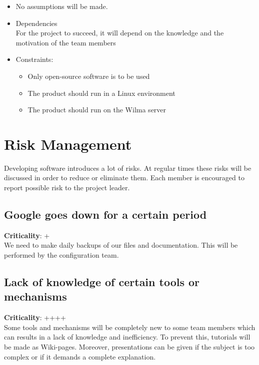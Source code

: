 \documentclass[a4paper, 12pt]{report}
\begin{document}
			\begin{itemize}
				
				\item No assumptions will be made.
				
				\item Dependencies \\
 					  For the project to succeed, it will depend on
					  the knowledge and the motivation of the team members	
				
				\item Constraints:
				\begin{itemize}
					\item Only open-source software is to be used
					\item The product should run in a Linux environment
					\item The product should run on the Wilma server
				\end{itemize}
				
			\end{itemize}	
			
		\section{Risk Management}
			
			Developing software introduces a lot of risks. At regular times these risks will
			be discussed in order to reduce or eliminate them. Each member is encouraged to report
			possible risk to the project leader.
			
			\subsection{Google goes down for a certain period}
			\textbf{Criticality}: + \\
			We need to make daily backups of our files and documentation. This will be 
			performed by the configuration team.
			
			
			\subsection{Lack of knowledge of certain tools or mechanisms}
			\textbf{Criticality}: ++++ \\
			Some tools and mechanisms will be completely new to some team members which can
			results in a lack of knowledge and inefficiency. To prevent this, tutorials will be
			made as Wiki-pages. Moreover, presentations can be given if the subject is 
			too complex or if it demands a complete explanation. 
			
\end{document}

